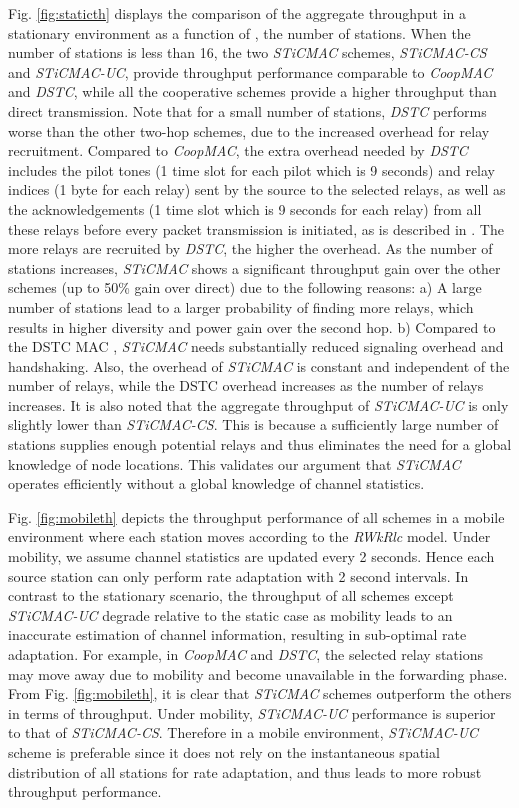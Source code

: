 \documentclass[peerreview,draftcls,onecolumn,12pt,a4paper]{IEEEtran}
\begin{document}
Fig. \ref{fig:staticth} displays the comparison of the aggregate
throughput in a stationary environment as a function of , the
number of stations. When the number of stations is less than 16,
the two \emph{STiCMAC} schemes, \emph{STiCMAC-CS} and
\emph{STiCMAC-UC}, provide throughput performance comparable to
\emph{CoopMAC} and {\em DSTC}, while all the cooperative schemes
provide a higher throughput than direct transmission. Note that
for a small number of stations, {\em DSTC} performs worse than the
other two-hop schemes, due to the increased overhead for relay
recruitment. Compared to {\em CoopMAC}, the extra overhead needed
by {\em DSTC} includes the pilot tones (1 time slot for each pilot
which is 9 seconds) and relay indices (1 byte for each relay)
sent by the source to the selected relays, as well as the
acknowledgements (1 time slot which is 9 seconds for each
relay) from all these relays before every packet transmission is
initiated, as is described in \cite{Jakllari06}. The more relays
are recruited by {\em DSTC}, the higher the overhead. As the
number of stations increases, \emph{STiCMAC} shows a significant
throughput gain over the other schemes (up to 50\% gain over direct) due to the following
reasons: a) A large number of stations lead to a larger
probability of finding more relays, which results in higher
diversity and power gain over the second hop. b) Compared to the
DSTC MAC \cite{Jakllari06}, \emph{STiCMAC} needs substantially
reduced signaling overhead and handshaking. Also, the
overhead of {\em STiCMAC} is constant and independent of the
number of relays, while the DSTC overhead increases as the number
of relays increases. It is also noted that the aggregate throughput of \emph{STiCMAC-UC} is only slightly lower than \emph{STiCMAC-CS}. This is because a sufficiently large number of stations supplies enough potential relays and thus eliminates the need for a
global knowledge of node locations. This validates our argument that {\em STiCMAC} operates
efficiently without a global knowledge of channel statistics.


Fig. \ref{fig:mobileth} depicts the throughput performance of all
schemes in a mobile environment where each station moves according
to the \emph{RWkRlc} model. Under mobility, we assume channel statistics are updated every 2 seconds. Hence each source
station can only perform rate adaptation with 2 second intervals. In contrast to the stationary
scenario, the throughput of all schemes except \emph{STiCMAC-UC}
degrade relative to the static case as mobility leads to an
inaccurate estimation of channel information, resulting in
sub-optimal rate adaptation. For example, in \emph{CoopMAC} and
\emph{DSTC}, the selected relay stations may move away due to
mobility and become unavailable in the forwarding phase. From Fig.
\ref{fig:mobileth}, it is clear that \emph{STiCMAC} schemes
outperform the others in terms of throughput. Under
mobility, \emph{STiCMAC-UC} performance is superior to that of
\emph{STiCMAC-CS}. Therefore in a mobile environment,
\emph{STiCMAC-UC} scheme is preferable since it does not rely on
the instantaneous spatial distribution of all stations for rate
adaptation, and thus leads to more robust throughput performance.
\end{document}
